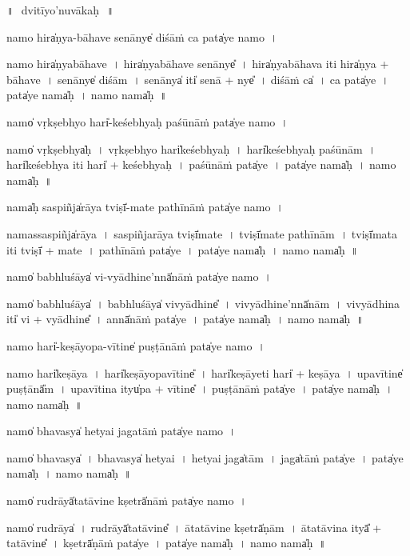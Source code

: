 \documentclass[parskip, DIV=14]{scrartcl}
\begin{document}
{%
\newpage
\LARGE
॥~\,dvitīyo'nuvākaḥ\,~॥ 
\Large
\vspace{0.5cm}

namo॒ hira̍ṇya-bāhave senā॒nye̍ di॒śāṁ ca॒ pata̍ye॒ namo॒~।

namo॒ hira̍ṇyabāhave~।
hira̍ṇyabāhave॒ senā॒nye̎~।
hira̍ṇyabāhava॒ iti॒ hira̍ṇya + bā॒ha॒ve॒~।
se॒nā॒nye̍ di॒śām~।
se॒nā॒nya̍ iti̍ senā + nye̎~।
di॒śāṁ ca̍~।   
ca॒ pata̍ye~।
pata̍ye॒ nama̍ḥ~।
namo॒ nama̍ḥ~॥ 

\vspace{0.5cm}
namo̍ vṛ॒kṣebhyo॒ hari̍-keśebhyaḥ paśū॒nāṁ pata̍ye॒ namo॒~।

namo̍ vṛ॒kṣebhya̍ḥ~।
vṛ॒kṣebhyo॒ hari̍keśebhyaḥ~।
hari̍keśebhyaḥ paśū॒nām~।
hari̍keśebhya॒ iti॒ hari̍ + ke॒śe॒bhya॒ḥ~।
pa॒śūnāṁ pata̍ye~।
pata̍ye॒ nama̍ḥ~।
namo॒ nama̍ḥ~॥ 

\vspace{0.5cm}
nama̍ḥ sa॒spiñja̍rāya॒ tviṣī̍-mate pathī॒nāṁ  pata̍ye॒ namo॒~।

namassa॒spiñja̍rāya~।
sa॒spiñja॒rāya॒ tviṣī̍mate~।
tviṣī̍mate pathī॒nām~।
tviṣī̍mata॒ iti॒ tviṣī̍ + ma॒te॒~।
pa॒thīnāṁ pata̍ye~।
pata̍ye॒ nama̍ḥ~।
namo॒ nama̍ḥ~॥ 

\vspace{0.5cm}
namo̍  babhlu॒śāya̍ vi-vyā॒dhine'nnā̍nā॒ṁ pata̍ye॒ namo॒~।

namo̍ babhlu॒śāya̍~।
ba॒bhlu॒śāya̍ vivyā॒dhine̎~।
vi॒vyā॒dhine'nnā̍nām~।
vi॒vyā॒dhina॒ iti̍ vi + vyā॒dhine̎~।
annā̍nā॒ṁ pata̍ye~।
pata̍ye॒ nama̍ḥ~।
namo॒ nama̍ḥ~॥ 

\vspace{0.5cm}
namo॒  hari̍-keṣāyopa-vī॒tine̍ pu॒ṣṭānā॒ṁ pata̍ye॒ namo॒~।

namo॒ hari̍keṣāya~।
hari̍keṣāyopavī॒tine̎~।
hari̍keṣā॒yeti॒ hari̍ + ke॒ṣā॒ya॒~।
u॒pa॒vī॒tine̍ pu॒ṣṭānā̎m~।
u॒pa॒vī॒tina॒ ityu̍pa + vī॒tine̎~।
pu॒ṣṭānā॒ṁ pata̍ye~।
pata̍ye॒ nama̍ḥ~।
namo॒ nama̍ḥ~॥ 

\vspace{0.5cm}
namo̍ bha॒vasya̍ he॒tyai jagatā॒ṁ pata̍ye॒ namo॒~।

namo̍ bha॒vasya̍~।
bha॒vasya̍ he॒tyai~।
he॒tyai jaga̍tām~।
jaga̍tā॒ṁ pata̍ye~।
pata̍ye॒ nama̍ḥ~।
namo॒ nama̍ḥ~॥ 

\vspace{0.5cm}
namo̍  ru॒drāyā̍tatā॒vine॒ kṣetrā̍nā॒ṁ pata̍ye॒ namo॒~।

namo̍  ru॒drāya̍~।
ru॒drāyā̍tatā॒vine̎~।
ā॒ta॒tā॒vine॒ kṣetrā̍ṇām~।
ā॒ta॒tā॒vina॒ ityā̎ + tatāvine̎~।
kṣetrā̍ṇā॒ṁ pata̍ye~।
pata̍ye॒ nama̍ḥ~।
namo॒ nama̍ḥ~॥ 

}
\end{document}
